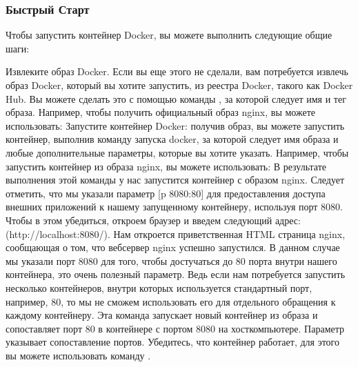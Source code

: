 \documentclass[letterpaper,10pt,russian]{sphinxmanual}
\begin{document}
\subsubsection{Быстрый Старт}
\label{\detokenize{educational_materials/docker_base/content:id6}}
\sphinxAtStartPar
Чтобы запустить контейнер Docker, вы можете выполнить следующие общие шаги:

\sphinxAtStartPar
Извлеките образ Docker. Если вы еще этого не сделали, вам потребуется извлечь образ Docker, который вы хотите запустить, из реестра Docker, такого как Docker Hub. Вы можете сделать это с помощью команды , за которой следует имя и тег образа.
Например, чтобы получить официальный образ nginx, вы можете использовать:
Запустите контейнер Docker: получив образ, вы можете запустить контейнер, выполнив команду запуска docker, за которой следует имя образа и любые дополнительные параметры, которые вы хотите указать.
Например, чтобы запустить контейнер из образа nginx, вы можете использовать:
В результате выполнения этой команды у нас запустится контейнер с образом nginx. Следует отметить, что мы указали параметр {[}\sphinxhyphen{}p 8080:80{]} для предоставления доступа внешних приложений к нашему запущенному контейнеру, используя порт 8080. Чтобы в этом убедиться, откроем браузер и введем следующий адрес: (http://localhost:8080/). Нам откроется приветственная HTML страница nginx, сообщающая о том, что веб\sphinxhyphen{}сервер nginx успешно запустился. В данном случае мы указали порт 8080 для того, чтобы достучаться до 80 порта внутри нашего контейнера, это очень полезный параметр. Ведь если нам потребуется запустить несколько контейнеров, внутри которых используется стандартный порт, например, 80, то мы не сможем использовать его для отдельного обращения к каждому контейнеру. Эта команда запускает новый контейнер из образа  и сопоставляет порт 80 в контейнере с портом 8080 на хост\sphinxhyphen{}компьютере. Параметр  указывает сопоставление портов. Убедитесь, что контейнер работает, для этого вы можете использовать команду .
\end{document}
